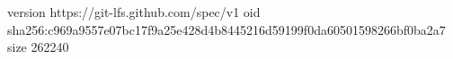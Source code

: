 version https://git-lfs.github.com/spec/v1
oid sha256:c969a9557e07bc17f9a25e428d4b8445216d59199f0da60501598266bf0ba2a7
size 262240
